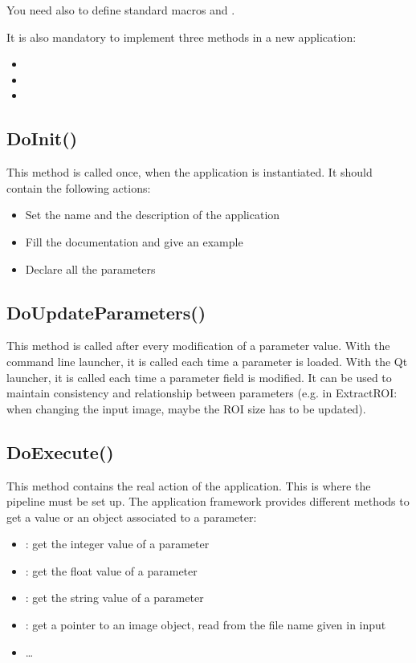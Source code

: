 You need also to define standard macros  and
.
 
It is also mandatory to implement three methods in a new application:
\begin{itemize}
  \item {}
  \item {}
  \item {}
\end{itemize}

\subsection{DoInit()}
\label{sec:appDoInit}
This method is called once, when the application is instantiated. It should 
contain the following actions:
\begin{itemize}
  \item Set the name and the description of the application
  \item Fill the documentation and give an example
  \item Declare all the parameters
\end{itemize}


\subsection{DoUpdateParameters()}
\label{sec:appDoUpdateParameters}
This method is called after every modification of a parameter value. With the command 
line launcher, it is called each time a parameter is loaded. With the Qt launcher, it
is called each time a parameter field is modified. It can be used to maintain consistency and relationship
between parameters (e.g. in ExtractROI: when changing the input image, maybe the ROI size 
has to be updated).

\subsection{DoExecute()}
\label{sec:appDoExecute}
This method contains the real action of the application. This is where the pipeline 
must be set up. The application framework provides different methods to get a value 
or an object associated to a parameter:
\begin{itemize}
  \item {} : get the integer value of a parameter
  \item {} : get the float value of a parameter
  \item {} : get the string value of a parameter
  \item {} : get a pointer to an image object, read from the
  file name given in input
  \item \dots
\end{itemize}

